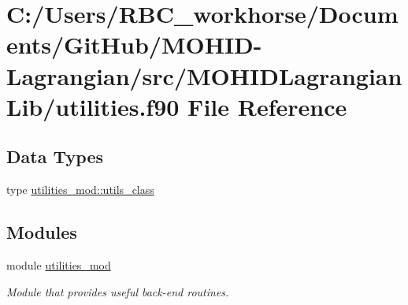 \hypertarget{utilities_8f90}{}\section{C\+:/\+Users/\+R\+B\+C\+\_\+workhorse/\+Documents/\+Git\+Hub/\+M\+O\+H\+I\+D-\/\+Lagrangian/src/\+M\+O\+H\+I\+D\+Lagrangian\+Lib/utilities.f90 File Reference}
\label{utilities_8f90}
\subsection*{Data Types}
\begin{DoxyCompactItemize}
\item 
type \mbox{\hyperlink{structutilities__mod_1_1utils__class}{utilities\+\_\+mod\+::utils\+\_\+class}}
\end{DoxyCompactItemize}
\subsection*{Modules}
\begin{DoxyCompactItemize}
\item 
module \mbox{\hyperlink{namespaceutilities__mod}{utilities\+\_\+mod}}
\begin{DoxyCompactList}\small\item\em Module that provides useful back-\/end routines. \end{DoxyCompactList}\end{DoxyCompactItemize}
